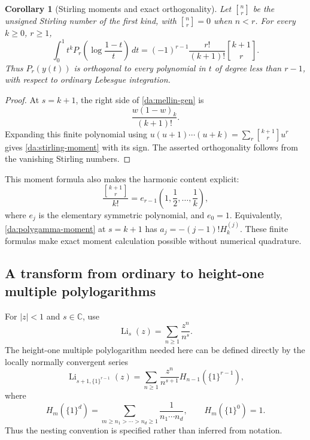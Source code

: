\documentclass[11pt,letterpaper]{article}
\numberwithin{equation}{section}
\newtheorem{corollary}[theorem]{Corollary}
\theoremstyle{definition}
\theoremstyle{remark}
\DeclareMathOperator{\Li}{Li}
\newcommand{\dd}{\,d}
\newcommand{\stir}[2]{\genfrac{[}{]}{0pt}{}{#1}{#2}}
\newcommand{\one}[1]{\{1\}^{#1}}
\begin{document}
\begin{corollary}[Stirling moments and exact orthogonality]
\label{da:stirling}
Let \(\stir nr\) be the unsigned Stirling number of the first kind, with
\(\stir nr=0\) when \(n<r\). For every \(k\ge0\), \(r\ge1\),
\begin{equation}\label{da:stirling-moment}
 \boxed{\displaystyle
  \int_0^1 t^kP_r\!\left(\log\frac{1-t}{t}\right)\dd t
    =(-1)^{r-1}\frac{r!}{(k+1)!}\stir{k+1}{r}.}
\end{equation}
Thus \(P_r(y(t))\) is orthogonal to every polynomial in \(t\) of degree
less than \(r-1\), with respect to ordinary Lebesgue integration.
\end{corollary}

\begin{proof}
At \(s=k+1\), the right side of \eqref{da:mellin-gen} is
\[
 \frac{w(1-w)_k}{(k+1)!}.
\]
Expanding this finite polynomial using
\(u(u+1)\cdots(u+k)=\sum_r\stir{k+1}{r}u^r\)
gives \eqref{da:stirling-moment} with its sign. The asserted
orthogonality follows from the vanishing Stirling numbers.
\end{proof}

This moment formula also makes the harmonic content explicit:
\[
 \frac{\stir{k+1}{r}}{k!}
 =e_{r-1}\left(1,\frac12,\ldots,\frac1k\right),
\]
where \(e_j\) is the elementary symmetric polynomial, and \(e_0=1\).
Equivalently, \eqref{da:polygamma-moment} at \(s=k+1\) has
\(a_j=-(j-1)!H_k^{(j)}\). These finite formulas make exact moment
calculation possible without numerical quadrature.

\subsection{A transform from ordinary to height-one multiple polylogarithms}

For \(|z|<1\) and \(s\in\mathbb C\), use
\[
 \Li_s(z)=\sum_{n\ge1}\frac{z^n}{n^s}.
\]
The height-one multiple polylogarithm needed here can be defined directly
by the locally normally convergent series
\begin{equation}\label{da:heightone-definition}
 \Li_{s+1,\one{r-1}}(z)
   =\sum_{n\ge1}\frac{z^n}{n^{s+1}}H_{n-1}(\one{r-1}),
\end{equation}
where
\[
 H_m(\one d)=
   \sum_{m\ge n_1>\cdots>n_d\ge1}\frac1{n_1\cdots n_d},
 \qquad H_m(\one0)=1.
\]
Thus the nesting convention is specified rather than inferred from
notation.
\end{document}
